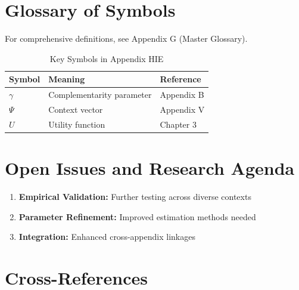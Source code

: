 \section{Glossary of Symbols}
\label{sec:hie-glossary}

For comprehensive definitions, see Appendix G (Master Glossary).

\begin{table}[htbp]
\centering
\caption{Key Symbols in Appendix HIE}
\begin{tabular}{lll}
\toprule
\textbf{Symbol} & \textbf{Meaning} & \textbf{Reference} \\
\midrule
$\gamma$ & Complementarity parameter & Appendix B \\
$\Psi$ & Context vector & Appendix V \\
$U$ & Utility function & Chapter 3 \\
\bottomrule
\end{tabular}
\end{table}



\section{Open Issues and Research Agenda}
\label{sec:hie-open}

\begin{enumerate}
    \item \textbf{Empirical Validation:} Further testing across diverse contexts
    \item \textbf{Parameter Refinement:} Improved estimation methods needed
    \item \textbf{Integration:} Enhanced cross-appendix linkages
\end{enumerate}

\section{Cross-References}

\nocite{bcm_master}

\label{sec:hie-crossref}

